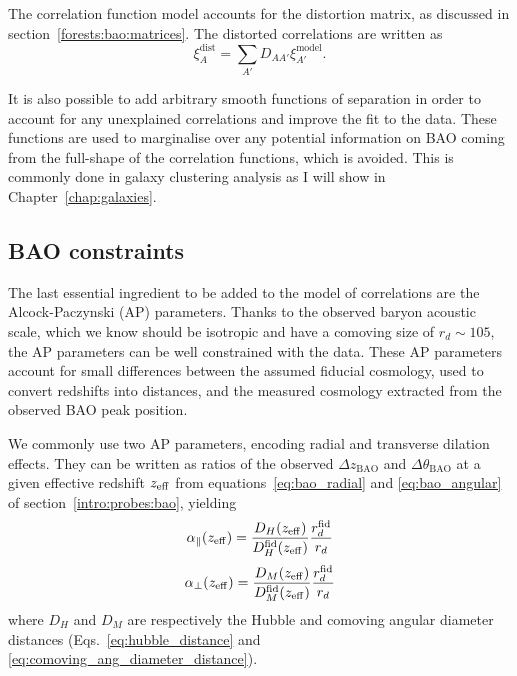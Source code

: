The correlation function model accounts for the distortion 
matrix, as discussed in section~\ref{forests:bao:matrices}. 
The distorted correlations are written as
\begin{equation}
    \xi^\mathrm{ dist}_A = \sum_{A'} D_{AA'} \xi^\mathrm{ model}_{A'}.
    \label{eq:xi_distorted}
\end{equation}  

It is also possible to add arbitrary smooth functions of separation
in order to account for any unexplained correlations and improve the fit
to the data. These functions are used to marginalise over any potential 
information on BAO coming from the full-shape of the correlation functions, 
which is avoided. This is commonly done in galaxy clustering analysis 
as I will show in Chapter~\ref{chap:galaxies}.


\subsection{BAO constraints}
\label{forests:bao:constraints}

The last essential ingredient to be added to the model of correlations
are the Alcock-Paczynski (AP) parameters. 
Thanks to the observed baryon acoustic scale, which we know should be isotropic and 
have a comoving size of $r_d \sim 105$\hmpc, the AP parameters can be well 
constrained with the data. These AP parameters account for small differences between 
the assumed fiducial cosmology, used to convert redshifts into distances, 
and the measured cosmology extracted from the observed BAO peak position.

We commonly use two AP parameters, encoding radial and transverse dilation 
effects. They can be written as ratios of the observed $\Delta z_\mathrm{BAO}$
and $\Delta \theta_\mathrm{BAO}$ at a given effective redshift $z_\mathrm{eff}$ 
from equations~\ref{eq:bao_radial} and \ref{eq:bao_angular}
of section~\ref{intro:probes:bao}, yielding
\begin{equation}  
    {\alpha_\parallel}(z_\mathrm{eff}) = \frac{D_H(z_\mathrm{eff})}{D_H^\mathrm{fid}(z_\mathrm{eff})} \frac{r_d^\mathrm{fid} }{r_d}
    \label{eq:alpha_parallel}
\end{equation}
\begin{equation}  
    {\alpha_\perp}(z_\mathrm{eff}) = \frac{D_M(z_\mathrm{eff})}{D_M^\mathrm{fid}(z_\mathrm{eff})} \frac{r_d^\mathrm{fid} }{r_d}
    \label{eq:alpha_perp}
\end{equation}
where $D_H$ and $D_M$ are respectively the Hubble and comoving angular diameter distances
(Eqs.~\ref{eq:hubble_distance} and \ref{eq:comoving_ang_diameter_distance}).

